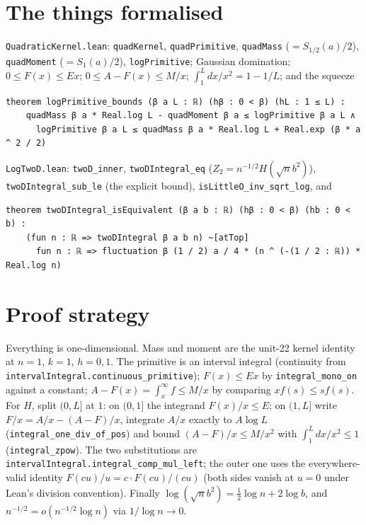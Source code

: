 \documentclass[11pt]{article}
\begin{document}
\section{The things formalised}
\texttt{QuadraticKernel.lean}: \texttt{quadKernel}, \texttt{quadPrimitive}, \texttt{quadMass}
($=S_{1/2}(a)/2$), \texttt{quadMoment} ($=S_1(a)/2$), \texttt{logPrimitive}; Gaussian domination;
$0\le F(x)\le Ex$; $0\le A-F(x)\le M/x$; $\int_1^Ldx/x^2=1-1/L$; and the squeeze
{\small
\begin{verbatim}
theorem logPrimitive_bounds (β a L : ℝ) (hβ : 0 < β) (hL : 1 ≤ L) :
    quadMass β a * Real.log L - quadMoment β a ≤ logPrimitive β a L ∧
      logPrimitive β a L ≤ quadMass β a * Real.log L + Real.exp (β * a ^ 2 / 2)
\end{verbatim}
}
\texttt{LogTwoD.lean}: \texttt{twoD\_inner}, \texttt{twoDIntegral\_eq} ($Z_2=n^{-1/2}H(\sqrt nb^2)$),
\texttt{twoDIntegral\_sub\_le} (the explicit bound), \texttt{isLittleO\_inv\_sqrt\_log}, and
{\small
\begin{verbatim}
theorem twoDIntegral_isEquivalent (β a b : ℝ) (hβ : 0 < β) (hb : 0 < b) :
    (fun n : ℝ => twoDIntegral β a b n) ~[atTop]
      fun n : ℝ => fluctuation β (1 / 2) a / 4 * (n ^ (-(1 / 2 : ℝ)) * Real.log n)
\end{verbatim}
}

\section{Proof strategy}
Everything is one-dimensional. Mass and moment are the unit-22 kernel identity at $n=1$, $k=1$,
$h=0,1$. The primitive is an interval integral (continuity from
\texttt{intervalIntegral.continuous\_primitive}); $F(x)\le Ex$ by \texttt{integral\_mono\_on} against a
constant; $A-F(x)=\int_x^\infty f\le M/x$ by comparing $xf(s)\le sf(s)$. For $H$, split $(0,L]$ at $1$:
on $(0,1]$ the integrand $F(x)/x\le E$; on $(1,L]$ write $F/x=A/x-(A-F)/x$, integrate $A/x$ exactly to
$A\log L$ (\texttt{integral\_one\_div\_of\_pos}) and bound $(A-F)/x\le M/x^2$ with $\int_1^L dx/x^2\le1$
(\texttt{integral\_zpow}). The two substitutions are \texttt{intervalIntegral.integral\_comp\_mul\_left};
the outer one uses the everywhere-valid identity $F(cu)/u=c\cdot F(cu)/(cu)$ (both sides vanish at $u=0$
under Lean's division convention). Finally $\log(\sqrt nb^2)=\tfrac12\log n+2\log b$, and
$n^{-1/2}=o(n^{-1/2}\log n)$ via $1/\log n\to0$.
\end{document}
